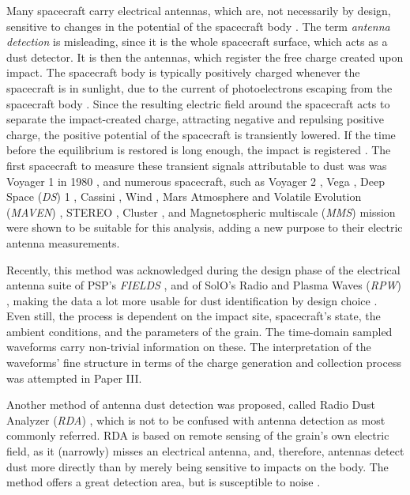 Many spacecraft carry electrical antennas, which are, not necessarily by design, sensitive to changes in the potential of the spacecraft body \citep{meyer2017frequency}. The term \textit{antenna detection} is misleading, since it is the whole spacecraft surface, which acts as a dust detector. It is then the antennas, which register the free charge created upon impact. The spacecraft body is typically positively charged whenever the spacecraft is in sunlight, due to the current of photoelectrons escaping from the spacecraft body \citep{guillemant2013simulation}. Since the resulting electric field around the spacecraft acts to separate the impact-created charge, attracting negative and repulsing positive charge, the positive potential of the spacecraft is transiently lowered. If the time before the equilibrium is restored is long enough, the impact is registered \citep{mann2019dust}. The first spacecraft to measure these transient signals attributable to dust was was Voyager 1 in 1980 \citep{scarf1982voyager,aubier1983shot,gurnett1997micron}, and numerous spacecraft, such as Voyager 2 \citep{gurnett1983micron}, Vega \citep{laakso1989impacts}, Deep Space (\textit{DS}) 1 \citep{tsurutani2003dust}, Cassini \citep{kurth2006cassini}, Wind \citep{malaspina2014interplanetary}, Mars Atmosphere and Volatile Evolution (\textit{MAVEN}) \citep{andersson2015dust}, STEREO \citep{zaslavsky2012interplanetary}, Cluster \citep{vaverka2017detection}, and Magnetospheric multiscale (\textit{MMS}) mission \citep{vaverka2018comparison} were shown to be suitable for this analysis, adding a new purpose to their electric antenna measurements. 

Recently, this method was acknowledged during the design phase of the electrical antenna suite of PSP's \textit{FIELDS} \citep{bale2016fields}, and of SolO's Radio and Plasma Waves (\textit{RPW}) \citep{maksimovic2020solar}, making the data a lot more usable for dust identification by design choice \citep{mann2019dust}. Even still, the process is dependent on the impact site, spacecraft's state, the ambient conditions, and the parameters of the grain. The time-domain sampled waveforms carry non-trivial information on these. The interpretation of the waveforms' fine structure in terms of the charge generation and collection process was attempted in Paper III. 

Another method of antenna dust detection was proposed, called Radio Dust Analyzer (\textit{RDA}) \citep{lesceux1989electric}, which is not to be confused with antenna detection as most commonly referred. RDA is based on remote sensing of the grain's own electric field, as it (narrowly) misses an electrical antenna, and, therefore, antennas detect dust more directly than by merely being sensitive to impacts on the body. The method offers a great detection area, but is susceptible to noise \citep{meuris1996detection,meyer2001detecting}. 


